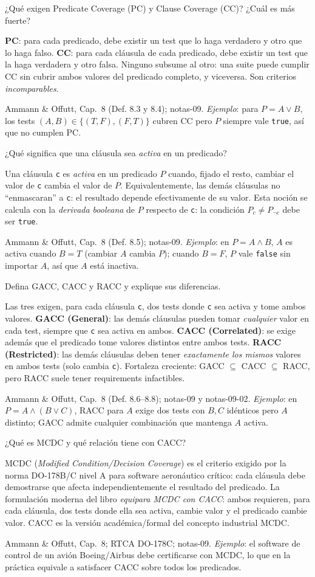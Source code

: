 \documentclass[11pt,a4paper]{article}
\newcounter{preg}
\newcommand{\qa}[3]{%
  \stepcounter{preg}%
  \vspace{0.4em}
  \begin{preguntabox}{\thepreg}
  #1
  \end{preguntabox}
  \begin{respuestabox}
  #2
  \end{respuestabox}
  \begin{refbox}
  #3
  \end{refbox}
  \vspace{0.6em}
}
\begin{document}
\qa{¿Qué exigen Predicate Coverage (PC) y Clause Coverage (CC)? ¿Cuál es más fuerte?}
{\textbf{PC}: para cada predicado, debe existir un test que lo haga verdadero y otro que lo haga falso. \textbf{CC}: para cada cláusula de cada predicado, debe existir un test que la haga verdadera y otro falsa. Ninguno subsume al otro: una suite puede cumplir CC sin cubrir ambos valores del predicado completo, y viceversa. Son criterios \emph{incomparables}.}
{Ammann \& Offutt, Cap.~8 (Def. 8.3 y 8.4); notas-09. \emph{Ejemplo}: para $P = A \lor B$, los tests $(A,B) \in \{(T,F),(F,T)\}$ cubren CC pero $P$ siempre vale \texttt{true}, así que no cumplen PC.}

\qa{¿Qué significa que una cláusula sea \emph{activa} en un predicado?}
{Una cláusula \texttt{c} es \emph{activa} en un predicado $P$ cuando, fijado el resto, cambiar el valor de \texttt{c} cambia el valor de $P$. Equivalentemente, las demás cláusulas no ``enmascaran'' a \texttt{c}: el resultado depende efectivamente de su valor. Esta noción se calcula con la \emph{derivada booleana} de $P$ respecto de \texttt{c}: la condición $P_c \neq P_{\neg c}$ debe ser \texttt{true}.}
{Ammann \& Offutt, Cap.~8 (Def. 8.5); notas-09. \emph{Ejemplo}: en $P = A \land B$, $A$ es activa cuando $B=T$ (cambiar $A$ cambia $P$); cuando $B=F$, $P$ vale \texttt{false} sin importar $A$, así que $A$ está inactiva.}

\qa{Defina GACC, CACC y RACC y explique sus diferencias.}
{Las tres exigen, para cada cláusula \texttt{c}, dos tests donde \texttt{c} sea activa y tome ambos valores. \textbf{GACC (General)}: las demás cláusulas pueden tomar \emph{cualquier} valor en cada test, siempre que \texttt{c} sea activa en ambos. \textbf{CACC (Correlated)}: se exige además que el predicado tome valores distintos entre ambos tests. \textbf{RACC (Restricted)}: las demás cláusulas deben tener \emph{exactamente los mismos} valores en ambos tests (solo cambia \texttt{c}). Fortaleza creciente: GACC $\subseteq$ CACC $\subseteq$ RACC, pero RACC suele tener requirements infactibles.}
{Ammann \& Offutt, Cap.~8 (Def. 8.6--8.8); notas-09 y notas-09-02. \emph{Ejemplo}: en $P = A \land (B \lor C)$, RACC para $A$ exige dos tests con $B,C$ idénticos pero $A$ distinto; GACC admite cualquier combinación que mantenga $A$ activa.}

\qa{¿Qué es MCDC y qué relación tiene con CACC?}
{MCDC (\emph{Modified Condition/Decision Coverage}) es el criterio exigido por la norma DO-178B/C nivel A para software aeronáutico crítico: cada cláusula debe demostrarse que afecta independientemente el resultado del predicado. La formulación moderna del libro \emph{equipara MCDC con CACC}: ambos requieren, para cada cláusula, dos tests donde ella sea activa, cambie valor y el predicado cambie valor. CACC es la versión académica/formal del concepto industrial MCDC.}
{Ammann \& Offutt, Cap.~8; RTCA DO-178C; notas-09. \emph{Ejemplo}: el software de control de un avión Boeing/Airbus debe certificarse con MCDC, lo que en la práctica equivale a satisfacer CACC sobre todos los predicados.}
\end{document}
